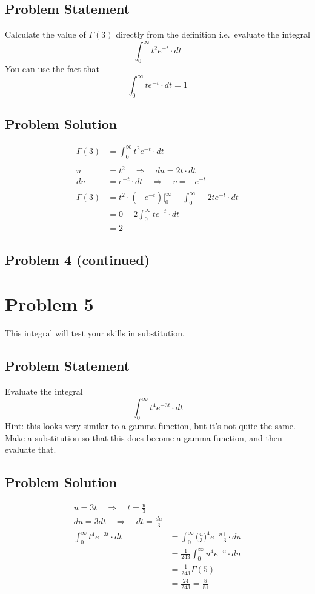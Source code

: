 \documentclass[12pt]{article}
\theoremstyle{definition}
\begin{document}
\subsection*{Problem Statement}

Calculate the value of $\Gamma(3)$ directly from the definition i.e.\ evaluate the integral
$$
\int_0^\infty t^2 e^{-t} \cdot dt
$$
You can use the fact that
$$
\int_0^\infty t e^{-t} \cdot dt = 1
$$

\subsection*{Problem Solution}
\begin{align*}
\Gamma(3) &= \int_0^\infty t^2 e^{-t} \cdot dt\\\\
u &= t^2 \quad\Rightarrow\quad du = 2t \cdot dt\\
dv &= e^{-t} \cdot dt \quad\Rightarrow\quad v = -e^{-t}\\\\
\Gamma(3) &=  t^{2} \cdot (-e^{-t})\biggr\rvert_0^{\infty} - \int_0^\infty -2te^{-t} \cdot dt\\
&= 0 + 2\int_0^\infty te^{-t} \cdot dt\\
&= 2
\end{align*}

\newpage
\subsection*{Problem 4 (continued)}


\newpage
\section*{Problem 5}

This integral will test your skills in substitution.

\subsection*{Problem Statement}

Evaluate the integral
$$
\int_0^\infty t^4 e^{-3t} \cdot dt
$$
Hint: this looks very similar to a gamma function, but it's not quite the same. Make a substitution so that this does become a gamma function, and then evaluate that.

\subsection*{Problem Solution}
\begin{align*}
u = 3t \quad\Rightarrow\quad t = \frac{u}{3}\\
du = 3dt \quad\Rightarrow\quad dt = \frac{du}{3}\\
\int_0^\infty t^4 e^{-3t} \cdot dt &= \int_0^\infty \biggr(\frac{u}{3}\biggr)^4 e^{-u} \frac{1}{3}\cdot du\\
&= \frac{1}{243}\int_0^\infty u^4 e^{-u}\cdot du\\
&= \frac{1}{243} \Gamma(5)\\
& = \frac{24}{243} = \frac{8}{81}
\end{align*}
\end{document}
